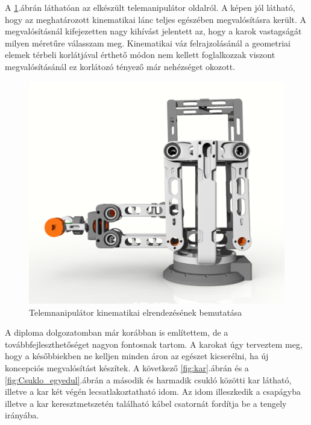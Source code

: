 A \ref{fig:Telemnanipulátor_kinematika}.ábrán láthatóan az elkészült telemanipulátor oldalról. A képen jól látható, hogy az meghatározott kinematikai lánc teljes egészében megvalósításra került. A megvalósításnál kifejezetten nagy kihívást jelentett az, hogy a karok vastagságát milyen méretűre válasszam meg. Kinematikai váz felrajzolásánál a geometriai elemek térbeli korlátjával érthető módon nem kellett foglalkozzak viszont megvalósításánál ez korlátozó tényező már nehézséget okozott.

\begin{figure}[!ht]
\centering
\includegraphics[width=120mm, keepaspectratio]{figures/Diploma_CAD/creo2.png}
\caption{Telemnanipulátor kinematikai elrendezésének bemutatása}
\label{fig:Telemnanipulátor_kinematika}
\end{figure}

A diploma dolgozatomban már korábban is említettem, de a továbbfejleszthetőséget nagyon fontosnak tartom. A karokat úgy terveztem meg, hogy a későbbiekben ne kelljen minden áron az egészet kicserélni, ha új koncepciós megvalósítást készítek. A következő \ref{fig:kar}.ábrán és a \ref{fig:Csuklo_egyedul}.ábrán a második és harmadik csukló közötti kar látható, illetve a kar két végén lecsatlakoztatható idom. Az idom illeszkedik a csapágyba illetve a kar keresztmetszetén található kábel csatornát fordítja be a tengely irányába.

